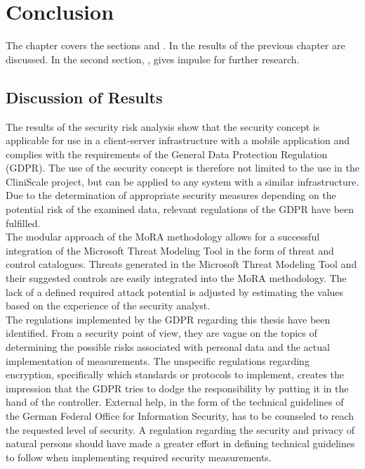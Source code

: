 \chapter{Conclusion}
\label{conclusion}

The chapter \textit{} covers the sections \textit{} and \textit{}. In \textit{} the results of the previous chapter \textit{} are discussed. In the second section, \textit{}, gives impulse for further research.
\section{Discussion of Results}
\label{discussion}
The results of the security risk analysis show that the security concept is applicable for use in a client-server infrastructure with a mobile application and complies with the requirements of the General Data Protection Regulation (GDPR). The use of the security concept is therefore not limited to the use in the CliniScale project, but can be applied to any system with a similar infrastructure. Due to the determination of appropriate security measures depending on the potential risk of the examined data, relevant regulations of the GDPR have been fulfilled.\\
\newline
The modular approach of the MoRA methodology allows for a successful integration of the Microsoft Threat Modeling Tool in the form of threat and control catalogues. Threats generated in the Microsoft Threat Modeling Tool and their suggested controls are easily integrated into the MoRA methodology. The lack of a defined required attack potential is adjusted by estimating the values based on the experience of the security analyst.\\
\newline
The regulations implemented by the GDPR regarding this thesis have been identified. From a security point of view, they are vague on the topics of determining the possible risks associated with personal data and the actual implementation of measurements. The unspecific regulations regarding encryption, specifically which standards or protocols to implement, creates the impression that the GDPR tries to dodge the responsibility by putting it in the hand of the controller. External help, in the form of the technical guidelines of the German Federal Office for Information Security, has to be counseled to reach the requested level of security. A regulation regarding the security and privacy of natural persons should have made a greater effort in defining technical guidelines to follow when implementing required security measurements.\\
\newline


